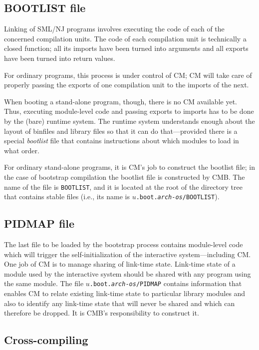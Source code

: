 \subsection{BOOTLIST file}

Linking of SML/NJ programs involves executing the code of each of the
concerned compilation units.  The code of each compilation unit is
technically a closed function; all its imports have been turned into
arguments and all exports have been turned into return values.

For ordinary programs, this process is under control of CM; CM will
take care of properly passing the exports of one compilation unit to
the imports of the next.

When booting a stand-alone program, though, there is no CM available
yet.  Thus, executing module-level code and passing exports to imports
has to be done by the (bare) runtime system.  The runtime system
understands enough about the layout of binfiles and library files so
that it can do that---provided there is a special {\em bootlist}
file that contains instructions about which modules to load in what
order.

For ordinary stand-alone programs, it is CM's job to construct the
bootlist file; in the case of bootstrap compilation the bootlist file
is constructed by CMB.  The name of the file is {\tt BOOTLIST}, and it
is located at the root of the directory tree that contains stable
files (i.e., its name is {\tt $u$.boot.{\it arch}-{\it os}/BOOTLIST}).

\subsection{PIDMAP file}

The last file to be loaded by the bootstrap process contains
module-level code which will trigger the self-initialization of the
interactive system---including CM.  One job of CM is to manage sharing
of link-time state.  Link-time state of a module used by the
interactive system should be shared with any program using the same
module.  The file {\tt $u$.boot.{\it arch}-{\it os}/PIDMAP} contains
information that enables CM to relate existing link-time state to
particular library modules and also to identify any link-time state
that will never be shared and which can therefore be dropped.  It is
CMB's responsibility to construct it.

\subsection{Cross-compiling}


